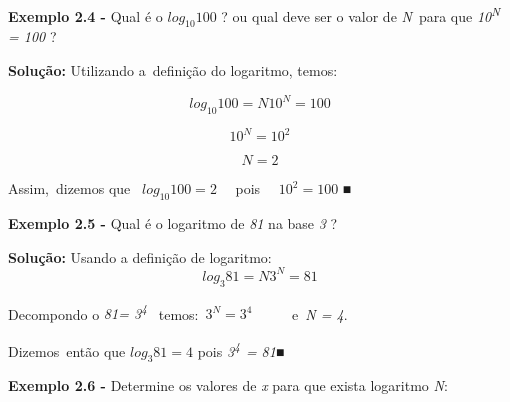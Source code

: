 \documentclass[12pt]{article}
\begin{document}
\begin{enumerate}[label*={\fontsize{14pt}{14pt}\selectfont \textbf{\arabic*.}}]
\vspace{\baselineskip}
\begin{justify}
\textbf{Exemplo 2.4 -} Qual é o  \( log_{10}100 \)  ? ou qual deve ser o valor de \textit{N}\  para que \textit{10\textsuperscript{N} = 100} ?
\end{justify}\par

\begin{justify}
 \textbf{Solução:} Utilizando a\ definição do logaritmo, temos:  
\end{justify}\par

\begin{justify}
 \[ log_{10}100=N  10^{N}=100 \] 
\end{justify}\par

\begin{justify}
 \[ 10^{N}=10^{2} \] 
\end{justify}\par

\begin{justify}
 \[ N=2 \] 
\end{justify}\par

Assim,\ dizemos que  \   \( log_{10}100=2 \) \ \  pois \ \   \( 10^{2}=100 \) ■\par


\vspace{\baselineskip}
\begin{justify}
\textbf{Exemplo 2.5 - }Qual é o logaritmo de \textit{81 }na base \textit{3} ? 
\end{justify}\par

\textbf{Solução:} Usando a definição de logaritmo:  \(  \)  \[ log_{3}81=N  3^{N}=81 \] \par

Decompondo o \textit{81= 3\textsuperscript{4}}\textsuperscript{\ \  }temos:\   \( 3^{N}=3^{4} \) \ \ \ \ \  e\  \textit{N = 4}. \par

Dizemos\ então que   \( log_{3}81=4  \)  pois  \textit{ 3\textsuperscript{4}}\textsuperscript{\  }\textit{= 81}■\par


\vspace{\baselineskip}
\textbf{Exemplo 2.6 - }Determine os valores de \textit{x} para que exista logaritmo \textit{N}:\par


\end{enumerate}
\end{document}
